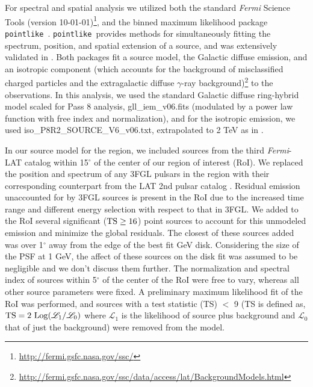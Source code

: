 \documentclass[iop]{emulateapj}
\newcommand{\gam}{$\gamma$-ray}
\newcommand{\Fermi}{\emph{Fermi}}  %
\newcommand{\FermiLat}{\emph{Fermi}-LAT }     %
\newcommand{\ptlike}{{\tt pointlike}}
\begin{document}
For spectral and spatial analysis we utilized both the standard \Fermi{} Science Tools (version 10-01-01)\footnote[1]{\url{http://fermi.gsfc.nasa.gov/ssc/}}, and the binned maximum likelihood package \ptlike~\citep{Kerr10}. \ptlike~provides methods for simultaneously fitting the spectrum, position, and spatial extension of a source, and was extensively validated in \cite{Lande12}. Both packages fit a source model, the Galactic diffuse emission, and an isotropic component (which accounts for the background of misclassified charged particles and the extragalactic diffuse \gam{}  background)\footnote[2]{\url{http://fermi.gsfc.nasa.gov/ssc/data/access/lat/BackgroundModels.html}} to the observations. In this analysis, we used the standard Galactic diffuse ring-hybrid model scaled for Pass 8 analysis, gll{\_}iem{\_}v06.fits (modulated by a power law function with free index and normalization), and for the isotropic emission,  we used iso{\_}P8R2{\_}SOURCE{\_}V6{\_}v06.txt, extrapolated to 2 TeV as in \cite{2FHL}.

In our source model for the region, we included sources from the third \FermiLat catalog \citep[3FGL]{3FGL} within 15$^\circ$ of the center of our region of interest (RoI). We replaced the position and spectrum of any 3FGL pulsars in the region with their corresponding counterpart  from the LAT 2nd pulsar catalog \citep{2PC}.  Residual emission unaccounted for by 3FGL sources is present in the RoI due to the increased time range and different energy selection with respect to that in 3FGL. We added to the RoI several significant (${\rm TS \geq 16}$) point sources to account for this unmodeled emission and minimize the global residuals. The closest of these sources added was over 1$^{\circ}$ away from the edge of the best fit GeV disk. Considering the size of the PSF at 1 GeV, the affect of these sources on the disk fit was assumed to be  negligible and we don't discuss them further.  The normalization and spectral index of sources within 5$^{\circ}$ of the center of the RoI were free to vary, whereas all other source parameters were fixed. A preliminary maximum likelihood fit of the RoI was performed, and  sources with a test statistic (TS) $<$ 9 (TS is defined as,  ${\rm TS}=2~{\rm Log}(\mathcal{L}_1 / \mathcal{L}_0)$ where $\mathcal{L}_1$ 
 is the likelihood of source plus background and  $\mathcal{L}_0$ that of just the background) were removed from the model. 
\end{document}
